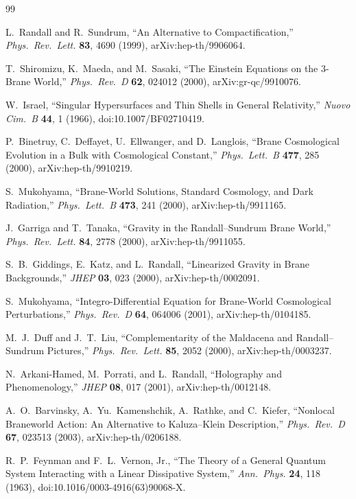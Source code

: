 \documentclass[11pt,a4paper]{article}
\theoremstyle{plain}
\theoremstyle{definition}
\begin{document}
\begin{thebibliography}{99}

L.~Randall and R.~Sundrum,
``An Alternative to Compactification,''
\emph{Phys.\ Rev.\ Lett.} \textbf{83}, 4690 (1999),
arXiv:hep-th/9906064.

T.~Shiromizu, K.~Maeda, and M.~Sasaki,
``The Einstein Equations on the 3-Brane World,''
\emph{Phys.\ Rev.\ D} \textbf{62}, 024012 (2000),
arXiv:gr-qc/9910076.

W.~Israel,
``Singular Hypersurfaces and Thin Shells in General Relativity,''
\emph{Nuovo Cim.\ B} \textbf{44}, 1 (1966),
doi:10.1007/BF02710419.

P.~Binetruy, C.~Deffayet, U.~Ellwanger, and D.~Langlois,
``Brane Cosmological Evolution in a Bulk with Cosmological Constant,''
\emph{Phys.\ Lett.\ B} \textbf{477}, 285 (2000),
arXiv:hep-th/9910219.

S.~Mukohyama,
``Brane-World Solutions, Standard Cosmology, and Dark Radiation,''
\emph{Phys.\ Lett.\ B} \textbf{473}, 241 (2000),
arXiv:hep-th/9911165.

J.~Garriga and T.~Tanaka,
``Gravity in the Randall--Sundrum Brane World,''
\emph{Phys.\ Rev.\ Lett.} \textbf{84}, 2778 (2000),
arXiv:hep-th/9911055.

S.~B.~Giddings, E.~Katz, and L.~Randall,
``Linearized Gravity in Brane Backgrounds,''
\emph{JHEP} \textbf{03}, 023 (2000),
arXiv:hep-th/0002091.

S.~Mukohyama,
``Integro-Differential Equation for Brane-World Cosmological
Perturbations,''
\emph{Phys.\ Rev.\ D} \textbf{64}, 064006 (2001),
arXiv:hep-th/0104185.

M.~J.~Duff and J.~T.~Liu,
``Complementarity of the Maldacena and Randall--Sundrum Pictures,''
\emph{Phys.\ Rev.\ Lett.} \textbf{85}, 2052 (2000),
arXiv:hep-th/0003237.

N.~Arkani-Hamed, M.~Porrati, and L.~Randall,
``Holography and Phenomenology,''
\emph{JHEP} \textbf{08}, 017 (2001),
arXiv:hep-th/0012148.

A.~O.~Barvinsky, A.~Yu.~Kamenshchik, A.~Rathke, and C.~Kiefer,
``Nonlocal Braneworld Action: An Alternative to Kaluza--Klein
Description,''
\emph{Phys.\ Rev.\ D} \textbf{67}, 023513 (2003),
arXiv:hep-th/0206188.

R.~P.~Feynman and F.~L.~Vernon, Jr.,
``The Theory of a General Quantum System Interacting with a Linear
Dissipative System,''
\emph{Ann.\ Phys.} \textbf{24}, 118 (1963),
doi:10.1016/0003-4916(63)90068-X.


\end{thebibliography}
\end{document}
